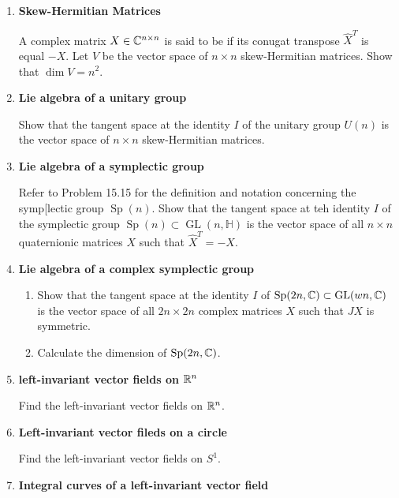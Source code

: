 \documentclass[12pt,a4paper]{report}
\newcommand{\SP}{\operatorname{Sp}}
\newcommand{\GL}{\operatorname{GL}}
\begin{document}
\begin{enumerate}[label=\textbf{16.\arabic*.}]

	\item \textbf{Skew-Hermitian Matrices}
	
	A complex matrix $X \in \mathbb{C}^{n\times n}$ is said to be  if its conugat transpose $\hat{X}^T$ is equal $-X$.  Let $V$ be the vector space of $n \times n$ skew-Hermitian matrices.  Show that $\dim V = n^2$.
	
	\item \textbf{Lie algebra of a unitary group}
	
	Show that the tangent space at the identity $I$ of the unitary group $U(n)$ is the vector space of $n \times n$ skew-Hermitian matrices.
	
	\item \textbf{Lie algebra of a symplectic group}
	
	Refer to Problem 15.15 for the definition and notation concerning the symp[lectic group $\SP(n)$.  Show that the tangent space at teh identity $I$ of the symplectic group $\SP(n) \subset \GL(n,\mathbb{H})$ is the vector space of all $n \times n$  quaternionic matrices $X$ such that $\hat{X}^T=-X$.
	
	\item \textbf{Lie algebra of a complex symplectic group}
	
	\begin{enumerate}[label=(\alph*)]
	
		\item Show that the tangent space at the identity $I$ of $\SP(2n,\C) \subset \GL(wn,\C)$ is the vector space of all $2n \times 2n$ complex matrices $X$ such that $JX$ is symmetric.
		
		\item Calculate the dimension of $\SP(2n,\C)$.
	
	\end{enumerate}
	
	\item \textbf{left-invariant vector fields on $\mathbb{R}^n$}
	
	Find the left-invariant vector fields on $\mathbb{R}^n$.
	
	\item \textbf{Left-invariant vector fileds on a circle}
	
	Find the left-invariant vector fields on $S^1$.
	
	\item \textbf{Integral curves of a left-invariant vector field}
	

\end{enumerate}
\end{document}
